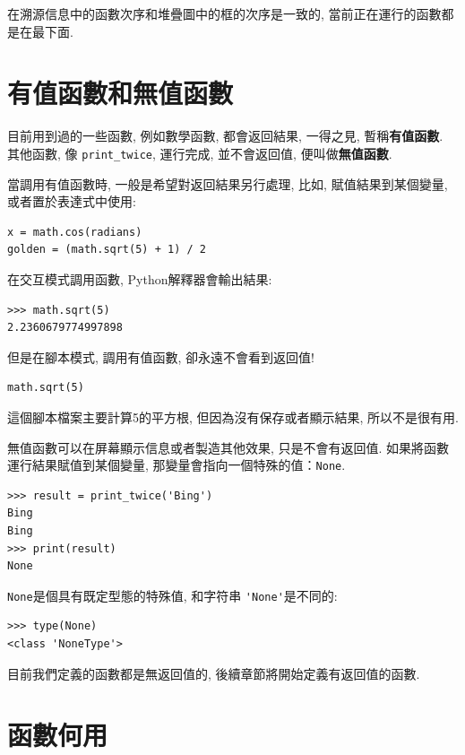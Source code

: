 \documentclass[10pt]{book}
\begin{document}
在溯源信息中的函數次序和堆疊圖中的框的次序是一致的, 
當前正在運行的函數都是在最下面. 

\section{有值函數和無值函數}

目前用到過的一些函數, 例如數學函數, 都會返回結果, 
一得之見, 暫稱{\bf 有值函數}. 其他函數, 像 \verb"print_twice", 
運行完成, 並不會返回值, 便叫做{\bf 無值函數}. 

當調用有值函數時, 一般是希望對返回結果另行處理, 比如, 
賦值結果到某個變量, 或者置於表達式中使用:

\begin{verbatim}
x = math.cos(radians)
golden = (math.sqrt(5) + 1) / 2
\end{verbatim}
%
在交互模式調用函數, Python解釋器會輸出結果:

\begin{verbatim}
>>> math.sqrt(5)
2.2360679774997898
\end{verbatim}
%
但是在腳本模式, 調用有值函數, 卻永遠不會看到返回值!

\begin{verbatim}
math.sqrt(5)
\end{verbatim}
%
這個腳本檔案主要計算5的平方根, 但因為沒有保存或者顯示結果, 所以不是很有用. 

無值函數可以在屏幕顯示信息或者製造其他效果, 
只是不會有返回值. 如果將函數運行結果賦值到某個變量, 
那變量會指向一個特殊的值：{\tt None}.

\begin{verbatim}
>>> result = print_twice('Bing')
Bing
Bing
>>> print(result)
None
\end{verbatim}
%
{\tt None}是個具有既定型態的特殊值, 和字符串 \verb"'None'"是不同的:

\begin{verbatim}
>>> type(None)
<class 'NoneType'>
\end{verbatim}
%
目前我們定義的函數都是無返回值的, 後續章節將開始定義有返回值的函數. 


\section{函數何用}
\end{document}
